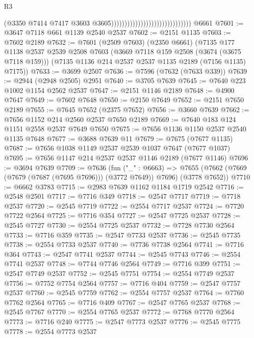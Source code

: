 \begin{lexlean}{R3}
\begin{coremodule}
                                                              (@3350
                                                                @7414
                                                                @7417
                                                                @3603
                                                                @3605))))))))))))))))))))))))))))))
    @6661
@7601 := @3647 @7118 @661 @1139 @2540 @2537
@7602 := @2151 @1135
@7603 := @7602 @2189
@7632 := @7601
    (@2509 @7603)
    (@2350 @6661)
    (@7135
      @177
      @1138
      @2537
      @2539
      @2508
      @7603
      (@3669 @7118 @159 @2508 (@3674 (@3675 @7118 @159)))
      (@7135 @1136 @214 @2537 @2537 @1135 @2189 (@7156 @1135) @7175))
@7633 := @3699 @2507
@7636 := @7596 (@7632 (@7633 @339))
@7639 := @2944 (@2948 @2505) @2951
@7640 := @3705 @7639
@7645 := @7640 @223 @1002 @1154 @2562 @2537
@7647 := @2151 @1146 @2189
@7648 := @4900 @7647
@7649 := @7602 @7648
@7650 := @2150 @7649
@7652 := @2151 @7650 @2189
@7655 := @7645 @7652 (@2375 @7652)
@7656 := @3660 @7639
@7662 := @7656 @1152 @214 @2560 @2537 @7650 @2189
@7669 := @7640 @183 @124 @1151 @2558 @2537 @7649 @7650
@7675 := @7656 @1136 @1150 @2537 @2540 @1135 @7648
@7677 := @3688 @7639 @11
@7679 := @7675 (@7677 @1135)
@7687 := @7656 @1038 @1149 @2537 @2539 @1037 @7647 (@7677 @1037)
@7695 := @7656 @1147 @214 @2537 @2537 @1146 @2189 (@7677 @1146)
@7696 := @3694 @7639
@7709 := @7636
    (fun ("_" : @6663) =>
    @7655 (@7662 (@7669 (@7679 (@7687 (@7695 @7696))) (@3772 @7649)) @7696) (@3778 @7652))
@7710 := @6662 @3783
@7715 := @2983 @7639 @1162 @1184 @1719 @2542
@7716 := @2548 @2501
@7717 := @7716 @349
@7718 := @2547 @7717
@7719 := @7718 @2537
@7720 := @2545 @7719
@7722 := @2554 @7717 @2537
@7724 := @7720 @7722 @2564
@7725 := @7716 @354
@7727 := @2547 @7725 @2537
@7728 := @2545 @7727
@7730 := @2554 @7725 @2537
@7732 := @7728 @7730 @2564
@7733 := @7716 @359
@7735 := @2547 @7733 @2537
@7736 := @2545 @7735
@7738 := @2554 @7733 @2537
@7740 := @7736 @7738 @2564
@7741 := @7716 @364
@7743 := @2547 @7741 @2537
@7744 := @2545 @7743
@7746 := @2554 @7741 @2537
@7748 := @7744 @7746 @2564
@7749 := @7716 @399
@7751 := @2547 @7749 @2537
@7752 := @2545 @7751
@7754 := @2554 @7749 @2537
@7756 := @7752 @7754 @2564
@7757 := @7716 @404
@7759 := @2547 @7757 @2537
@7760 := @2545 @7759
@7762 := @2554 @7757 @2537
@7764 := @7760 @7762 @2564
@7765 := @7716 @409
@7767 := @2547 @7765 @2537
@7768 := @2545 @7767
@7770 := @2554 @7765 @2537
@7772 := @7768 @7770 @2564
@7773 := @7716 @240
@7775 := @2547 @7773 @2537
@7776 := @2545 @7775
@7778 := @2554 @7773 @2537

\end{coremodule}
\end{lexlean}
